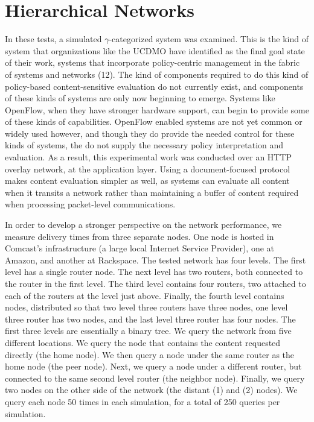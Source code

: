 \section{Hierarchical Networks}
In these tests, a simulated $\gamma$-categorized system was examined.  This is the kind of system that organizations like the UCDMO have identified as the final goal state of their work, systems that incorporate policy-centric management in the fabric of systems and networks (12).  The kind of components required to do this kind of policy-based content-sensitive evaluation do not currently exist, and components of these kinds of systems are only now beginning to emerge.  Systems like OpenFlow, when they have stronger hardware support, can begin to provide some of these kinds of capabilities.  OpenFlow enabled systems are not yet common or widely used however, and though they do provide the needed control for these kinds of systems, the do not supply the necessary policy interpretation and evaluation.  As a result, this experimental work was conducted over an HTTP overlay network, at the application layer.  Using a document-focused protocol makes content evaluation simpler as well, as systems can evaluate all content when it transits a network rather than maintaining a buffer of content required when processing packet-level communications.

In order to develop a stronger perspective on the network performance, we measure delivery times from three separate nodes.   One node is hosted in Comcast's infrastructure (a large local Internet Service Provider), one at Amazon, and another at Rackspace.  The tested network has four levels.  The first level has a single router node.  The next level has two routers, both connected to the router in the first level.  The third level contains four routers, two attached to each of the routers at the level just above.  Finally, the fourth level contains nodes, distributed so that two level three routers have three nodes, one level three router has two nodes, and the last level three router has four nodes.  The first three levels are essentially a binary tree.  We query the network from five different locations.  We query the node that contains the content requested directly (the home node).  We then query a node under the same router as the home node (the peer node).  Next, we query a node under a different router, but connected to the same second level router (the neighbor node).  Finally, we query two nodes on the other side of the network (the distant (1) and (2) nodes).  We query each node 50 times in each simulation, for a total of 250 queries per simulation.


